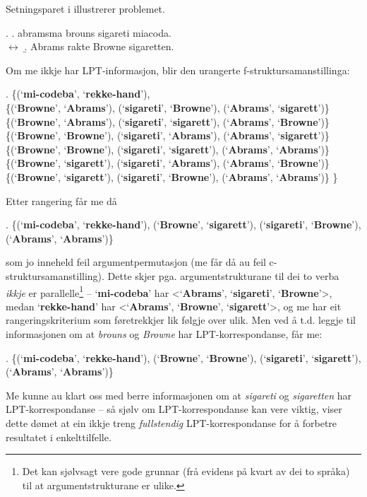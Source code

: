 \documentclass[12pt,a4paper,oneside,draft]{report}
\newcommand{\p}[1]{`\textbf{#1}'}
\begin{document}
 Setningsparet i \Next illustrerer problemet.

\ex. \a. abramsma brouns sigareti miacoda.\\
     $\leftrightarrow$
     \b. Abrams rakte Browne sigaretten.
     
 Om me ikkje har LPT\hyp{}informasjon, blir den urangerte
 f\hyp{}struktursamanstillinga:

\ex. \{(\p{mi-codeba}, \p{rekke-hand}), \\
 \{(\p{Browne}, \p{Abrams}),   (\p{sigareti}, \p{Browne}),   (\p{Abrams}, \p{sigarett})\} \\
 \{(\p{Browne}, \p{Abrams}),   (\p{sigareti}, \p{sigarett}), (\p{Abrams}, \p{Browne})\} \\
 \{(\p{Browne}, \p{Browne}),   (\p{sigareti}, \p{Abrams}),   (\p{Abrams}, \p{sigarett})\} \\
 \{(\p{Browne}, \p{Browne}),   (\p{sigareti}, \p{sigarett}), (\p{Abrams}, \p{Abrams})\} \\
 \{(\p{Browne}, \p{sigarett}), (\p{sigareti}, \p{Abrams}),   (\p{Abrams}, \p{Browne})\} \\
 \{(\p{Browne}, \p{sigarett}), (\p{sigareti}, \p{Browne}),   (\p{Abrams}, \p{Abrams})\} \}

 Etter rangering får me då 

\ex. \{(\p{mi-codeba}, \p{rekke-hand}), (\p{Browne}, \p{sigarett}), (\p{sigareti}, \p{Browne}), (\p{Abrams}, \p{Abrams})\} 

som jo inneheld feil argumentpermutasjon (me får då au feil
 c\hyp{}struktursamanstilling). Dette skjer pga. argumentstrukturane
 til dei to verba \emph{ikkje} er parallelle\footnote{Det kan sjølvsagt vere gode grunnar (frå evidens på kvart av
        dei to språka) til at argumentstrukturane er ulike. } -- \p{mi-codeba} har
 <\p{Abrams}, \p{sigareti}, \p{Browne}>, medan \p{rekke-hand} har
 <\p{Abrams}, \p{Browne}, \p{sigarett}>, og me har eit
 rangeringskriterium som føretrekkjer lik følgje over ulik. Men ved å
 t.d. leggje til informasjonen om at \emph{brouns} og \emph{Browne} har
 LPT\hyp{}korrespondanse, får me:

\ex. \{(\p{mi-codeba}, \p{rekke-hand}), (\p{Browne}, \p{Browne}), (\p{sigareti}, \p{sigarett}), (\p{Abrams}, \p{Abrams})\}

 Me kunne au klart oss med berre informasjonen om at \emph{sigareti} og
 \emph{sigaretten} har LPT\hyp{}korrespondanse -- så sjølv om LPT\hyp{}korrespondanse
 kan vere viktig, viser dette dømet at ein ikkje treng \emph{fullstendig}
 LPT\hyp{}korrespondanse for å forbetre resultatet i enkelttilfelle.
\end{document}
